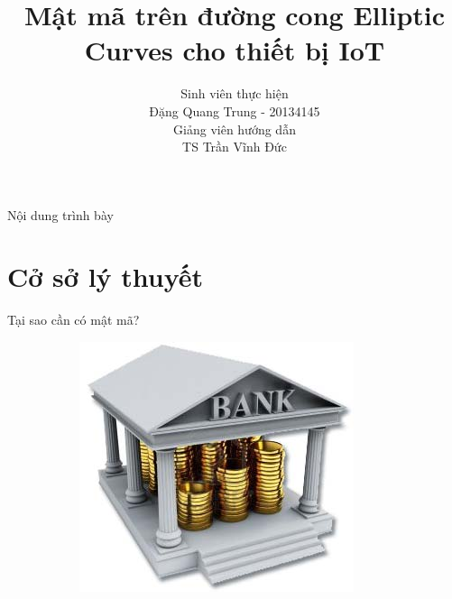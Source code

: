 \documentclass[compress]{beamer}
\title[Mật mã trên đường cong Elliptic Curves cho thiết bị IoT]{Mật mã trên đường cong Elliptic Curves cho thiết bị IoT}
\author[Đặng Quang Trung]{
Sinh viên thực hiện\\
Đặng Quang Trung - 20134145 \\[1em]
Giảng viên hướng dẫn\\
TS Trần Vĩnh Đức}
\begin{document}
\begin{frame}[plain]
\titlepage
\end{frame}

\begin{frame}[plain]{Nội dung trình bày}
\tableofcontents
\end{frame}

\section{Cở sở lý thuyết}
\begin{frame}{Tại sao cần có mật mã?}
\begin{figure}[h]
\begin{subfigure}{.35\textwidth}
  \centering
  \includegraphics[width=1\linewidth]{../bank.jpg}
  \label{fig:sfig1}
\end{subfigure}%
\begin{subfigure}{.35\textwidth}
  \centering

\end{subfigure}
\end{figure}
\end{frame}
\end{document}
